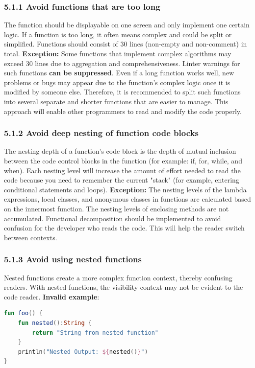 \subsubsection*{\textbf{5.1.1 Avoid functions that are too long}}
\leavevmode\newline
\label{sec:5.1.1}
The function should be displayable on one screen and only implement one certain logic.
If a function is too long, it often means complex and could be split or simplified. Functions should consist of 30 lines (non-empty and non-comment) in total.
\textbf{Exception:} Some functions that implement complex algorithms may exceed 30 lines due to aggregation and comprehensiveness.
Linter warnings for such functions \textbf{can be suppressed}.
Even if a long function works well, new problems or bugs may appear due to the function's complex logic once it is modified by someone else.
Therefore, it is recommended to split such functions into several separate and shorter functions that are easier to manage.
This approach will enable other programmers to read and modify the code properly.
\subsubsection*{\textbf{5.1.2 Avoid deep nesting of function code blocks}}
\leavevmode\newline
\label{sec:5.1.2}
The nesting depth of a function's code block is the depth of mutual inclusion between the code control blocks in the function (for example: if, for, while, and when).
Each nesting level will increase the amount of effort needed to read the code because you need to remember the current "stack" (for example, entering conditional statements and loops).
\textbf{Exception:} The nesting levels of the lambda expressions, local classes, and anonymous classes in functions are calculated based on the innermost function. The nesting levels of enclosing methods are not accumulated.
Functional decomposition should be implemented to avoid confusion for the developer who reads the code.
This will help the reader switch between contexts.
\subsubsection*{\textbf{5.1.3 Avoid using nested functions}}
\leavevmode\newline
\label{sec:5.1.3}
Nested functions create a more complex function context, thereby confusing readers.
With nested functions, the visibility context may not be evident to the code reader.
\textbf{Invalid example}:
\begin{lstlisting}[language=Kotlin]
fun foo() {
    fun nested():String {
        return "String from nested function"
    }
    println("Nested Output: ${nested()}")
}
\end{lstlisting}

